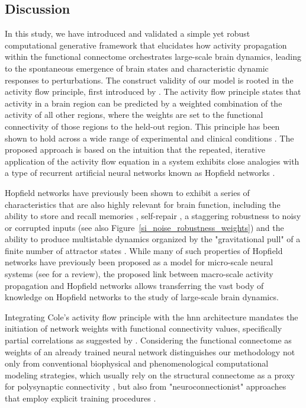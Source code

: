 \documentclass{article}
\begin{document}
\subsection{Discussion}

In this study, we have introduced and validated a simple yet robust computational generative framework that elucidates how activity propagation within the functional connectome orchestrates large-scale brain dynamics, leading to the spontaneous emergence of brain states and characteristic dynamic responses to perturbations.
The construct validity of our model is rooted in the activity flow principle, first introduced by \citet{cole2016activity}. The activity flow principle states that activity in a brain region can be predicted by a weighted combination of the activity of all other regions, where the weights are set to the functional connectivity of those regions to the held-out region. This principle has been shown to hold across a wide range of experimental and clinical conditions \citep{cole2016activity, ito2017cognitive, mill2022network, hearne2021activity, chen2018human}.
The proposed approach is based on the intuition that the repeated, iterative application of the activity flow equation in a system exhibits close analogies with a type of recurrent artificial neural networks known as Hopfield networks \citep{hopfield1982neural}.

Hopfield networks have previously been shown to exhibit a series of characteristics that are also highly relevant for
brain function, including the ability to store and recall memories \citep{hopfield1982neural}, self-repair \citep{murre2003selfreparing},
a staggering robustness to noisy or corrupted inputs \citep{hertz1991introduction} (see also Figure~\ref{si_noise_robustness_weights}) and the ability to produce multistable dynamics organized by the "gravitational pull" of a finite number of attractor states \citep{khona2022attractor}. While many of such properties of Hopfield networks have previously been proposed as a model for micro-scale neural systems (see \cite{khona2022attractor} for a review), the proposed link between macro-scale activity propagation and Hopfield networks allows transferring the vast body of knowledge on Hopfield networks to the study of large-scale brain dynamics.

Integrating Cole's activity flow principle with the \acrshort{hnn} architecture mandates the initiation of network weights with functional connectivity values, specifically partial correlations as suggested by \citet{cole2016activity}.
Considering the functional connectome as weights of an already trained neural network distinguishes our methodology not only from conventional biophysical and phenomenological computational modeling strategies, which usually rely on the structural connectome as a proxy for polysynaptic connectivity \citep{cabral2017functional}, but also from "neuroconnectionist" approaches that employ explicit training procedures \citep{doerig2023neuroconnectionist}.
\end{document}
